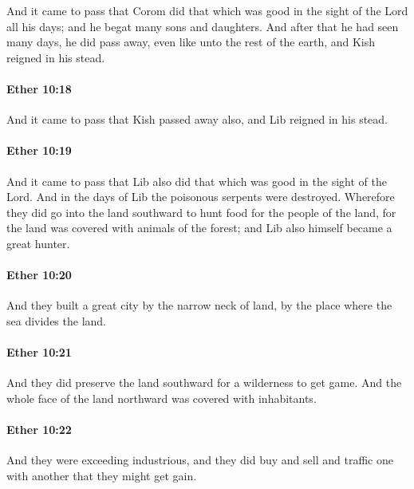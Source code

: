 			And it came to pass that Corom did that
			which was good in the sight of the Lord all his days;
			and he begat many sons and daughters.
			And after that he had seen many days, he did pass away,
			even like unto the rest of the earth,
			and Kish reigned in his stead.

		\paragraph{Ether 10:18} %
			\label{ETHER-10-18}

			And it came to pass that Kish passed away also,
			and Lib reigned in his stead.

		\paragraph{Ether 10:19} %
			\label{ETHER-10-19}

			And it came to pass that
			Lib also did that which was good in the sight of the Lord.
			And in the days of Lib the poisonous serpents were destroyed.
			Wherefore they did go into the land southward
			to hunt food for the people of the land,
			for the land was covered with animals of the forest;
			and Lib also himself became a great hunter.

		\paragraph{Ether 10:20} %
			\label{ETHER-10-20}

			And they built a great city by the narrow neck of land,
			by the place where the sea divides the land.

		\paragraph{Ether 10:21} %
			\label{ETHER-10-21}

			And they did preserve the land southward for a wilderness to get game.
			And the whole face of the land northward was covered with inhabitants.

		\paragraph{Ether 10:22} %
			\label{ETHER-10-22}

			And they were exceeding industrious,
			and they did buy and sell and traffic one with another that they might get gain.

